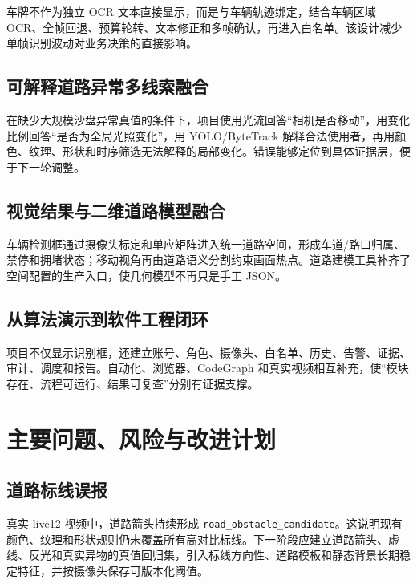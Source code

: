 车牌不作为独立 OCR 文本直接显示，而是与车辆轨迹绑定，结合车辆区域 OCR、全帧回退、预算轮转、文本修正和多帧确认，再进入白名单。该设计减少单帧识别波动对业务决策的直接影响。

\subsection{可解释道路异常多线索融合}\label{summary-ux53efux89e3ux91caux9053ux8defux5f02ux5e38ux591aux7ebfux7d22ux878dux5408}

在缺少大规模沙盘异常真值的条件下，项目使用光流回答``相机是否移动''，用变化比例回答``是否为全局光照变化''，用 YOLO/ByteTrack 解释合法使用者，再用颜色、纹理、形状和时序筛选无法解释的局部变化。错误能够定位到具体证据层，便于下一轮调整。

\subsection{视觉结果与二维道路模型融合}\label{summary-ux89c6ux89c9ux7ed3ux679cux4e0eux4e8cux7ef4ux9053ux8defux6a21ux578bux878dux5408}

车辆检测框通过摄像头标定和单应矩阵进入统一道路空间，形成车道/路口归属、禁停和拥堵状态；移动视角再由道路语义分割约束画面热点。道路建模工具补齐了空间配置的生产入口，使几何模型不再只是手工 JSON。

\subsection{从算法演示到软件工程闭环}\label{summary-ux4eceux7b97ux6cd5ux6f14ux793aux5230ux8f6fux4ef6ux5de5ux7a0bux95edux73af}

项目不仅显示识别框，还建立账号、角色、摄像头、白名单、历史、告警、证据、审计、调度和报告。自动化、浏览器、CodeGraph 和真实视频相互补充，使``模块存在、流程可运行、结果可复查''分别有证据支撑。

\section{主要问题、风险与改进计划}\label{summary-ux4e3bux8981ux95eeux9898ux98ceux9669ux4e0eux6539ux8fdbux8ba1ux5212}

\subsection{道路标线误报}\label{summary-ux9053ux8defux6807ux7ebfux8befux62a5}

真实 live12 视频中，道路箭头持续形成 \texttt{road\_\allowbreak{}obstacle\_\allowbreak{}candidate}。这说明现有颜色、纹理和形状规则仍未覆盖所有高对比标线。下一阶段应建立道路箭头、虚线、反光和真实异物的真值回归集，引入标线方向性、道路模板和静态背景长期稳定特征，并按摄像头保存可版本化阈值。

